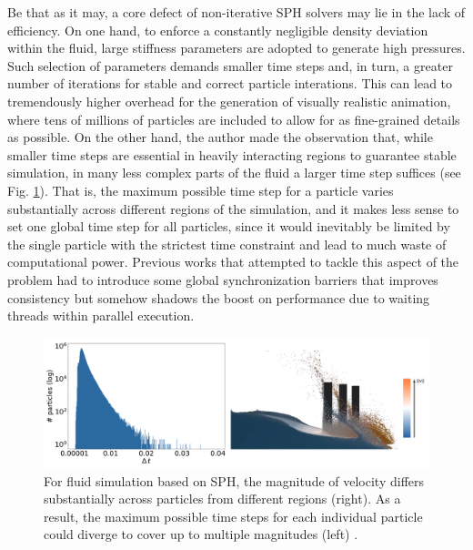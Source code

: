 \documentclass[
	11pt, 
	DIV10,
	ngerman,
	a4paper, 
	oneside, 
	headings=normal, 
	captions=tableheading,
	final, 
	numbers=noenddot
]{scrartcl}
\begin{document}
\par
Be that as it may, a core defect of non-iterative SPH solvers may lie in the lack of efficiency. On one hand, to enforce a constantly negligible density deviation within the fluid, large stiffness parameters are adopted to generate high pressures. Such selection of parameters demands smaller time steps and, in turn, a greater number of iterations for stable and correct particle interations. This can lead to tremendously higher overhead for the generation of visually realistic animation, where tens of millions of particles are included to allow for as fine-grained details as possible. On the other hand, the author made the observation that, while smaller time steps are essential in heavily interacting regions to guarantee stable simulation, in many less complex parts of the fluid a larger time step suffices (see Fig. \ref{fig2}). That is, the maximum possible time step for a particle varies substantially across different regions of the simulation, and it makes less sense to set one global time step for all particles, since it would inevitably be limited by the single particle with the strictest time constraint and lead to much waste of computational power. Previous works that attempted to tackle this aspect of the problem had to introduce some global synchronization barriers that improves consistency but somehow shadows the boost on performance due to waiting threads within parallel execution.

\begin{figure}[tb]
	\centering
	\includegraphics[scale=0.28]{images/1}
	\caption{\label{fig2} For fluid simulation based on SPH, the magnitude of velocity differs substantially across particles from different regions (right). As a result, the maximum possible time steps for each individual particle could diverge to cover up to multiple magnitudes (left) \cite{reinhardt2017fully}.}
\end{figure}
\end{document}
